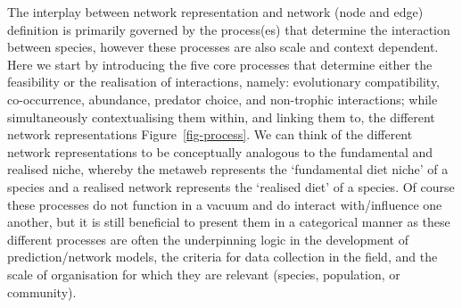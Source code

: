 \documentclass[
]{article}
\begin{document}
The interplay between network representation and network (node and edge)
definition is primarily governed by the process(es) that determine the
interaction between species, however these processes are also scale and
context dependent. Here we start by introducing the five core processes
that determine either the feasibility or the realisation of
interactions, namely: evolutionary compatibility, co-occurrence,
abundance, predator choice, and non-trophic interactions; while
simultaneously contextualising them within, and linking them to, the
different network representations Figure~\ref{fig-process}. We can think
of the different network representations to be conceptually analogous to
the fundamental and realised niche, whereby the metaweb represents the
`fundamental diet niche' of a species and a realised network represents
the `realised diet' of a species. Of course these processes do not
function in a vacuum and do interact with/influence one another, but it
is still beneficial to present them in a categorical manner as these
different processes are often the underpinning logic in the development
of prediction/network models, the criteria for data collection in the
field, and the scale of organisation for which they are relevant
(species, population, or community).
\end{document}
